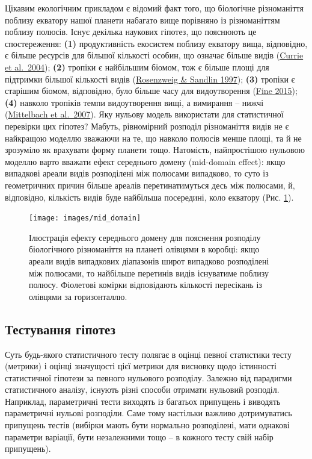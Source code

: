 \documentclass[
  11pt,
]{book}
\begin{document}
Цікавим екологічним прикладом є відомий факт того, що біологічне різноманіття поблизу екватору нашої планети набагато вище порівняно із різноманіттям поблизу полюсів. Існує декілька наукових гіпотез, що пояснюють це спостереження: \textbf{(1)} продуктивність екосистем поблизу екватору вища, відповідно, є більше ресурсів для більшої кількості особин, що означає більше видів (\href{https://doi.org/10.1111/j.1461-0248.2004.00671.x}{Currie et al.~2004}); \textbf{(2)} тропіки є найбільшим біомом, тож є більше площі для підтримки більшої кількості видів (\href{https://doi.org/10.2307/3546528}{Rosenzweig \& Sandlin 1997}); \textbf{(3)} тропіки є старішим біомом, відповідно, було більше часу для видоутворення (\href{https://doi.org/10.1146/annurev-ecolsys-112414-054102}{Fine 2015}); \textbf{(4)} навколо тропіків темпи видоутворення вищі, а вимирання -- нижчі (\href{https://doi.org/10.1111/j.1461-0248.2007.01020.x}{Mittelbach et al.~2007}). Яку нульову модель використати для статистичної перевірки цих гіпотез? Мабуть, рівномірний розподіл різноманіття видів не є найкращою моделлю зважаючи на те, що навколо полюсів менше площі, та й не зрозуміло як врахувати форму планети тощо. Натомість, найпростішою нульовою моделлю варто вважати ефект середнього домену (mid-domain effect): якщо випадкові ареали видів розподілені між полюсами випадково, то суто із геометричних причин більше ареалів перетинатимуться десь між полюсами, й, відповідно, кількість видів буде найбільша посередині, коло екватору (Рис. \ref{fig:fig-3-11}).

\begin{figure}
\texttt{[image: images/mid\_domain]} \caption{Ілюстрація ефекту середнього домену для пояснення розподілу біологічного різноманіття на планеті олівцями в коробці: якщо ареали видів випадкових діапазонів широт випадково розподілені між полюсами, то найбільше перетинів видів існуватиме поблизу полюсу. Фіолетові комірки відповідають кількості пересікань із олівцями за горизонталлю.}\label{fig:fig-3-11}
\end{figure}

\subsection{Тестування гіпотез}\label{pval}

Суть будь-якого статистичного тесту полягає в оцінці певної статистики тесту (метрики) і оцінці значущості цієї метрики для висновку щодо істинності статистичної гіпотези за певного нульового розподілу. Залежно від парадигми статистичного аналізу, існують різні способи отримати нульовий розподіл. Наприклад, параметричні тести виходять із багатьох припущень і виводять параметричні нульові розподіли. Саме тому настільки важливо дотримуватись припущень тестів (вибірки мають бути нормально розподілені, мати однакові параметри варіації, бути незалежними тощо -- в кожного тесту свій набір припущень).
\end{document}
